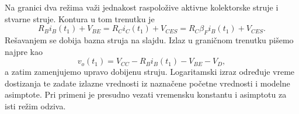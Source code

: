 Na granici dva režima važi jednakost raspoložive aktivne kolektorske struje i stvarne struje. Kontura u tom trenutku je
\[R_Bi_B(t_1)+V_{BE}=R_Ci_C(t_1)+V_{CES}=R_C\beta_Fi_B(t_1)+V_{CES}.\]
Rešavanjem se dobija bazna struja na slajdu. Izlaz u graničnom trenutku pišemo najpre kao
\[v_o(t_1)=V_{CC}-R_Bi_B(t_1)-V_{BE}-V_D,\]
a zatim zamenjujemo upravo dobijenu struju. Logaritamski izraz određuje vreme dostizanja te zadate izlazne vrednosti iz naznačene početne vrednosti i modelne asimptote. Pri primeni je presudno vezati vremensku konstantu i asimptotu za isti režim odziva.
